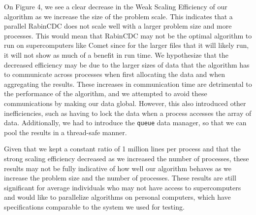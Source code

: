 \documentclass{acmtog} %
\begin{document}
	On Figure 4, we see a clear decrease in the Weak Scaling Efficiency of our algorithm as we increase the size of the problem scale. This indicates that a parallel RabinCDC does not scale well with a larger problem size and more processes. This would mean that RabinCDC may not be the optimal algorithm to run on supercomputers like Comet since for the larger files that it will likely run, it will not show as much of a benefit in run time. We hypothesize that the decreased efficiency may be due to the larger sizes of data that the algorithm has to communicate across processes when first allocating the data and when aggregating the results. These increases in communication time are detrimental to the performance of the algorithm, and we attempted to avoid these communications by making our data global. However, this also introduced other inefficiencies, such as having to lock the data when a process accesses the array of data. Additionally, we had to introduce the \texttt{queue} data manager, so that we can pool the results in a thread-safe manner. 
	
	Given that we kept a constant ratio of 1 million lines per process and that the strong scaling efficiency decreased as we increased the number of processes, these results may not be fully indicative of how well our algorithm behaves as we increase the problem size and the number of processes. These results are still significant for average individuals who may not have access to supercomputers and would like to parallelize algorithms on personal computers, which have specifications comparable to the system we used for testing. 
	
\end{document}
